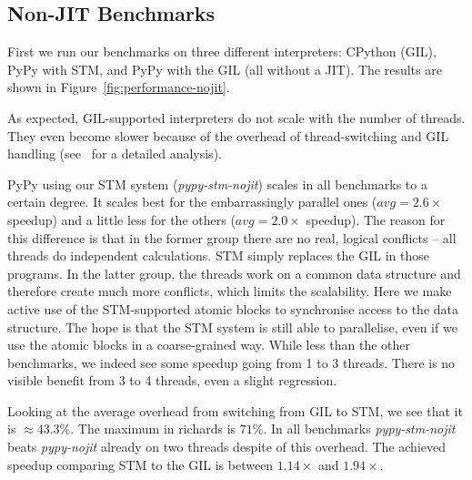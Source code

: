 \documentclass{sigplanconf}
\begin{document}






\subsection{Non-JIT Benchmarks}
First we run our benchmarks on three different interpreters: CPython
(GIL), PyPy with STM, and PyPy with the GIL (all without a JIT). The
results are shown in Figure~\ref{fig:performance-nojit}.

As expected, GIL-supported interpreters do not scale with the number
of threads. They even become slower because of the overhead of
thread-switching and GIL handling (see~\cite{beazley10} for a detailed
analysis).

PyPy using our STM system (\emph{pypy-stm-nojit}) scales in all
benchmarks to a certain degree. It scales best for the embarrassingly
parallel ones ($avg=2.6\times$ speedup) and a little less for
the others ($avg=2.0\times$ speedup). The reason for this difference is
that in the former group there are no real, logical conflicts -- all
threads do independent calculations. STM simply replaces the GIL in
those programs. In the latter group, the threads work on a common data
structure and therefore create much more conflicts, which limits the
scalability. Here we make active use of the STM-supported atomic
blocks to synchronise access to the data structure. The hope
is that the STM system is still able to parallelise, even if we use
the atomic blocks in a coarse-grained way. While less than the other
benchmarks, we indeed see some speedup going from 1 to 3 threads.
There is no visible benefit from 3 to 4 threads, even a slight
regression.

Looking at the average overhead from switching from GIL to STM, we see
that it is $\approx 43.3\%$. The maximum in richards is $71\%$. In all
benchmarks \emph{pypy-stm-nojit} beats \emph{pypy-nojit} already on
two threads despite of this overhead.  The achieved speedup comparing
STM to the GIL is between $1.14\times$ and $1.94\times$.
\end{document}
